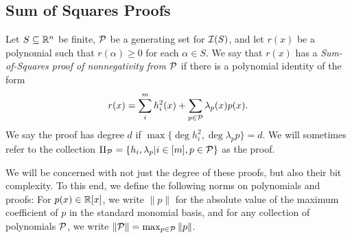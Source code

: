 \subsection{Sum of Squares Proofs}
\begin{definition}
Let $S \subseteq \mathbb R^n$ be finite, $\mathcal P$ be a generating set for $\mathcal I(S)$, and let $r(x)$ be a polynomial such that $r(\alpha) \geq 0$ for each $\alpha \in S$. We say that $r(x)$ has a \emph{Sum-of-Squares proof of nonnegativity from $\mathcal P$} if there is a polynomial identity of the form
\[r(x) = \sum_i^m h_i^2(x) + \sum_{p \in \mathcal P} \lambda_p(x) p(x).\]
We say the proof has degree $d$ if $\max \{\deg h_i^2, \deg \lambda_p p\} = d$. We will sometimes refer to the collection $\Pi_\mathcal P = \{h_i, \lambda_p | i \in [m], p \in \mathcal P\}$ as the proof. 
\end{definition}
We will be concerned with not just the degree of these proofs, but also their bit complexity. To this end, we define the following norms on polynomials and proofs: For $p(x) \in \mathbb R[x]$, we write $\|p\|$ for the absolute value of the maximum coefficient of $p$ in the standard monomial basis, and for any collection of polynomials $\mathcal P$, we write $\|\mathcal P\| = \max_{p \in \mathcal P} \|p\|$. 
